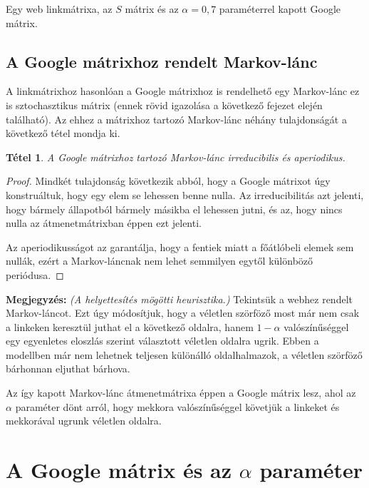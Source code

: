 \documentclass[12pt,a4paper]{article}
\newtheorem{tetel}{Tétel}
\begin{document}
\vspace{0.1 cm}
\centerline{Egy web linkmátrixa, az $S$ mátrix és az $\alpha = 0,7$ paraméterrel kapott Google mátrix.}

\subsection{A Google mátrixhoz rendelt Markov-lánc}\label{google_matrix_markov}

A linkmátrixhoz hasonlóan a Google mátrixhoz is rendelhető egy Markov-lánc ez is sztochasztikus mátrix (ennek rövid igazolása a következő fejezet elején található). Az ehhez a mátrixhoz tartozó Markov-lánc néhány tulajdonságát a következő tétel mondja ki.

\begin{tetel}
	A Google mátrixhoz tartozó Markov-lánc irreducibilis és aperiodikus.
\end{tetel}
\begin{proof}
	Mindkét tulajdonság következik abból, hogy a Google mátrixot úgy konstruáltuk, hogy egy elem se lehessen benne nulla. Az irreducibilitás azt jelenti, hogy bármely állapotból bármely másikba el lehessen jutni, és az, hogy nincs nulla az átmenetmátrixban éppen ezt jelenti. 
	
	Az aperiodikusságot az garantálja, hogy a fentiek miatt a főátlóbeli elemek sem nullák, ezért a Markov-láncnak nem lehet semmilyen egytől különböző periódusa.
\end{proof}

\noindent
\textbf{Megjegyzés:} \textit{(A helyettesítés mögötti heurisztika.)} \newline
Tekintsük a webhez rendelt Markov-láncot. Ezt úgy módosítjuk, hogy a véletlen szörföző most már nem csak a linkeken keresztül juthat el a következő oldalra, hanem $1-\alpha$ valószínűséggel egy egyenletes eloszlás szerint választott véletlen oldalra ugrik. Ebben a modellben már nem lehetnek teljesen különálló oldalhalmazok, a véletlen szörföző bárhonnan eljuthat bárhova.

Az így kapott Markov-lánc átmenetmátrixa éppen a Google mátrix lesz, ahol az $\alpha$ paraméter dönt arról, hogy mekkora valószínűséggel követjük a linkeket és mekkorával ugrunk véletlen oldalra.

\section{A Google mátrix és az $\alpha$ paraméter}
\end{document}
